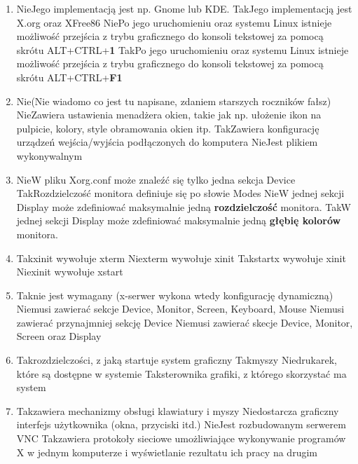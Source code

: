 \begin{enumerate}
	\item {}
	{Nie}{Jego implementacją jest np. Gnome lub KDE.}
	{Tak}{Jego implementacją jest X.org oraz XFree86}
	{Nie}{Po jego uruchomieniu oraz systemu Linux istnieje możliwość przejścia z trybu graficznego do konsoli tekstowej za pomocą skrótu ALT+CTRL+\textbf{1}}
	{Tak}{Po jego uruchomieniu oraz systemu Linux istnieje możliwość przejścia z trybu graficznego do konsoli tekstowej za pomocą skrótu ALT+CTRL+\textbf{F1}}
	
	\item {}
	{Nie}{(Nie wiadomo co jest tu napisane, zdaniem starszych roczników fałsz)}
	{Nie}{Zawiera ustawienia menadżera okien, takie jak np. ułożenie ikon na pulpicie, kolory, style obramowania okien itp.}
	{Tak}{Zawiera konfigurację urządzeń wejścia/wyjścia podłączonych do komputera}
	{Nie}{Jest plikiem wykonywalnym}
	
	\item {}
	{Nie}{W pliku Xorg.conf może znaleźć się tylko jedna sekcja Device}
	{Tak}{Rozdzielczość monitora definiuje się po słowie Modes}
	{Nie}{W jednej sekcji Display może zdefiniować maksymalnie jedną \textbf{rozdzielczość} monitora.}
	{Tak}{W jednej sekcji Display może zdefiniować maksymalnie jedną \textbf{głębię kolorów} monitora.}
	
	\item {}
	{Tak}{xinit wywołuje xterm}
	{Nie}{xterm wywołuje xinit}
	{Tak}{startx wywołuje xinit}
	{Nie}{xinit wywołuje xstart}
	
	\item {}
	{Tak}{nie jest wymagany (x-serwer wykona wtedy konfigurację dynamiczną)}
	{Nie}{musi zawierać sekcje Device, Monitor, Screen, Keyboard, Mouse}
	{Nie}{musi zawierać przynajmniej sekcję Device}
	{Nie}{musi zawierać skecje Device, Monitor, Screen oraz Display}
	
	\item {}
	{Tak}{rozdzielczości, z jaką startuje system graficzny}
	{Tak}{myszy}
	{Nie}{drukarek, które są dostępne w systemie}
	{Tak}{sterownika grafiki, z którego skorzystać ma system}
	
	\item {}
	{Tak}{zawiera mechanizmy obsługi klawiatury i myszy}
	{Nie}{dostarcza graficzny interfejs użytkownika (okna, przyciski itd.)}
	{Nie}{Jest rozbudowanym serwerem VNC}
	{Tak}{zawiera protokoły sieciowe umożliwiające wykonywanie programów X w jednym komputerze i wyświetlanie rezultatu ich pracy na drugim}
	

\end{enumerate}
